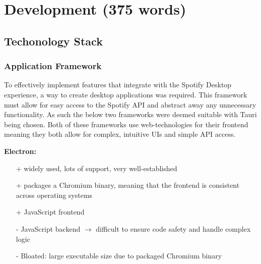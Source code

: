 \chapter{Development (375 words)}
\section{Techonology Stack}
\subsection{Application Framework}
To effectively implement features that integrate with the Spotify Desktop experience, a way to create desktop applications was required. This framework must allow for easy access to the Spotify API and abstract away any unnecessary functionality. As such the below two frameworks were deemed suitable with Tauri being chosen. Both of these frameworks use web-technologies for their frontend meaning they both allow for complex, intuitive UIs and simple API access.

\textbf{Electron:}\begin{itemize}
    \item[+] widely used, lots of support, very well-established
    \item[+] packages a Chromium binary, meaning that the frontend is consistent across operating systems
    \item[+] JavaScript frontend
    \item[-] JavaScript backend \(\to\) difficult to ensure code safety and handle complex logic
    \item[-] Bloated: large executable size due to packaged Chromium binary
\end{itemize}

